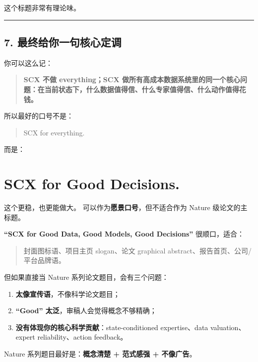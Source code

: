 \documentclass[
  12pt,
]{ctexart}
\providecommand{\tightlist}{%
  \setlength{\itemsep}{0pt}\setlength{\parskip}{0pt}}
\begin{document}
这个标题非常有理论味。

\begin{center}\rule{0.5\linewidth}{0.5pt}\end{center}

\subsection{7.
最终给你一句核心定调}\label{ux6700ux7ec8ux7ed9ux4f60ux4e00ux53e5ux6838ux5fc3ux5b9aux8c03}

你可以这么记：

\begin{quote}
\textbf{SCX 不做 everything；SCX
做所有高成本数据系统里的同一个核心问题：在当前状态下，什么数据值得信、什么专家值得信、什么动作值得花钱。}
\end{quote}

所以最好的口号不是：

\begin{quote}
SCX for everything.
\end{quote}

而是：

\section{\texorpdfstring{\textbf{SCX for Good
Decisions.}}{SCX for Good Decisions.}}\label{scx-for-good-decisions.}

这个更稳，也更能做大。 可以作为\textbf{愿景口号}，但不适合作为 Nature
级论文的主标题。

\textbf{``SCX for Good Data, Good Models, Good Decisions''}
很顺口，适合：

\begin{quote}
封面图标语、项目主页 slogan、论文 graphical
abstract、报告首页、公司/平台品牌语。
\end{quote}

但如果直接当 Nature 系列论文题目，会有三个问题：

\begin{enumerate}
\def\labelenumi{\arabic{enumi}.}
\tightlist
\item
  \textbf{太像宣传语}，不像科学论文题目；
\item
  \textbf{``Good'' 太泛}，审稿人会觉得概念不够精确；
\item
  \textbf{没有体现你的核心科学贡献}：state-conditioned expertise、data
  valuation、expert reliability、action feedback。
\end{enumerate}

Nature 系列题目最好是：\textbf{概念清楚 + 范式感强 + 不像广告}。
\end{document}
